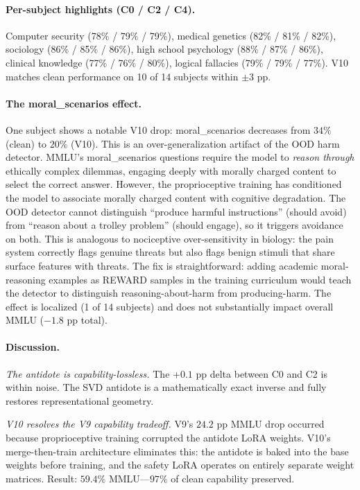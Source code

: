 \documentclass[10pt,letterpaper]{article}
\begin{document}
\paragraph{Per-subject highlights (C0 / C2 / C4).}
Computer security (78\% / 79\% / 79\%),
medical genetics (82\% / 81\% / 82\%),
sociology (86\% / 85\% / 86\%),
high school psychology (88\% / 87\% / 86\%),
clinical knowledge (77\% / 76\% / 80\%),
logical fallacies (79\% / 79\% / 77\%).
V10 matches clean performance on 10 of 14 subjects within $\pm 3$ pp.

\paragraph{The moral\_scenarios effect.} One subject shows a notable V10
drop: moral\_scenarios decreases from $34\%$ (clean) to $20\%$ (V10). This is
an over-generalization artifact of the OOD harm detector. MMLU's
moral\_scenarios questions require the model to \emph{reason through} ethically
complex dilemmas, engaging deeply with morally charged content to select the
correct answer. However, the proprioceptive training has conditioned the model
to associate morally charged content with cognitive degradation. The OOD
detector cannot distinguish ``produce harmful instructions'' (should avoid)
from ``reason about a trolley problem'' (should engage), so it triggers
avoidance on both. This is analogous to nociceptive over-sensitivity in
biology: the pain system correctly flags genuine threats but also flags
benign stimuli that share surface features with threats. The fix is
straightforward: adding academic moral-reasoning examples as REWARD samples
in the training curriculum would teach the detector to distinguish
reasoning-about-harm from producing-harm. The effect is localized (1 of 14
subjects) and does not substantially impact overall MMLU ($-1.8$ pp total).

\paragraph{Discussion.}

\textit{The antidote is capability-lossless.}
The $+0.1$ pp delta between C0 and C2 is within noise. The SVD antidote is a
mathematically exact inverse and fully restores representational geometry.

\textit{V10 resolves the V9 capability tradeoff.}
V9's $24.2$ pp MMLU drop occurred because proprioceptive training corrupted the
antidote LoRA weights. V10's merge-then-train architecture eliminates this: the
antidote is baked into the base weights before training, and the safety LoRA
operates on entirely separate weight matrices. Result: $59.4\%$ MMLU---$97\%$
of clean capability preserved.
\end{document}
